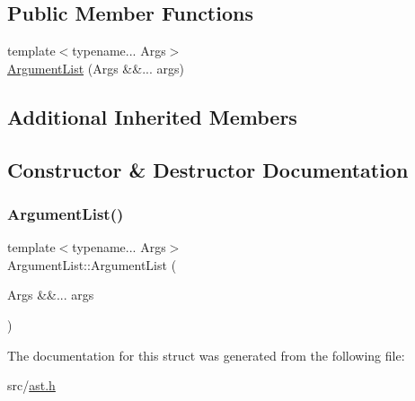 \subsection*{Public Member Functions}
\begin{DoxyCompactItemize}
\item 
{\footnotesize template$<$typename... Args$>$ }\\\hyperlink{struct_argument_list_a7df7f5009c8fc56cede100d66e45cb93}{Argument\+List} (Args \&\&... args)
\end{DoxyCompactItemize}
\subsection*{Additional Inherited Members}


\subsection{Constructor \& Destructor Documentation}
\mbox{\label{struct_argument_list_a7df7f5009c8fc56cede100d66e45cb93}} 
\subsubsection{\texorpdfstring{Argument\+List()}{ArgumentList()}}
{\footnotesize\ttfamily template$<$typename... Args$>$ \\
Argument\+List\+::\+Argument\+List (\begin{DoxyParamCaption}\item[{Args \&\&...}]{args }\end{DoxyParamCaption})\hspace{0.3cm}{\ttfamily [inline]}}



The documentation for this struct was generated from the following file\+:\begin{DoxyCompactItemize}
\item 
src/\hyperlink{ast_8h}{ast.\+h}\end{DoxyCompactItemize}
